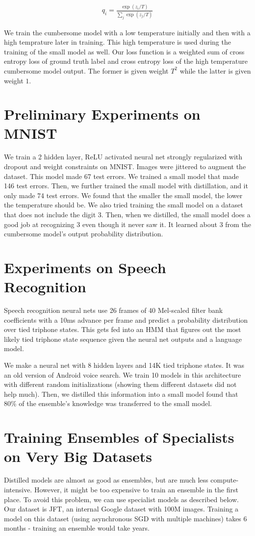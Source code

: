 \documentclass[a4paper]{article}
\begin{document}
\begin{align}
  q_i = \frac{\exp(z_i / T)}{\sum_{j}{\exp(z_j / T)}}
\end{align}

We train the cumbersome model with a low temperature initially and then with
a high temprature later in training. This high temperature is used during the
training of the small model as well. Our loss function is a weighted sum of
cross entropy loss of ground truth label and cross entropy loss of the
high temperature cumbersome model output. The former is given weight $T^2$ while
the latter is given weight $1$.

\section{Preliminary Experiments on MNIST}
We train a 2 hidden layer, ReLU activated neural net strongly regularized with
dropout and weight constraints on MNIST. Images were jittered to augment the
dataset. This model made 67 test errors. We trained a small model that made
146 test errors. Then, we further trained the small model with distillation,
and it only made 74 test errors. We found that the smaller the small model,
the lower the temperature should be. We also tried training the small model
on a dataset that does not include the digit 3. Then, when we distilled,
the small model does a good job at recognizing 3 even though it never saw it.
It learned about 3 from the cumbersome model's output probability distribution.

\section{Experiments on Speech Recognition}
Speech recognition neural nets use 26 frames of 40 Mel-scaled filter bank
coefficients with a 10ms advance per frame and predict a probability
distribution over tied triphone states. This gets fed into an HMM that figures
out the most likely tied triphone state sequence given the neural net outputs
and a language model.

We make a neural net with 8 hidden layers and 14K tied triphone states. It was
an old version of Android voice search. We train 10 models in this architecture
with different random initializations (showing them different datasets did not
help much). Then, we distilled this information into a small model found that
80\% of the ensemble's knowledge was transferred to the small model.

\section{Training Ensembles of Specialists on Very Big Datasets}
Distilled models are almost as good as ensembles, but are much less
compute-intensive. However, it might be too expensive to train an ensemble in
the first place. To avoid this problem, we can use specialist models as
described below. Our dataset is JFT, an internal Google dataset with 100M
images. Training a model on this dataset (using asynchronous SGD with multiple
machines) takes 6 months - training an ensemble would take years.
\end{document}
